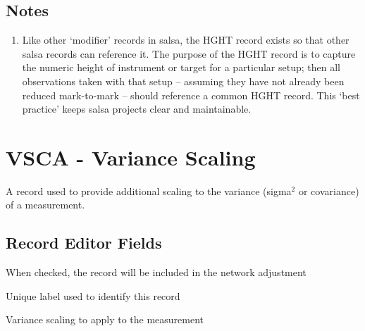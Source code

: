 \subsection*{Notes}
\begin{enumerate}
\item Like other `modifier' records in \textsf{salsa}, the HGHT record exists so that other \textsf{salsa} records can reference it.
The purpose of the HGHT record is to capture the numeric height of instrument or target for a particular setup; then all observations
taken with that setup -- assuming they have not already been reduced mark-to-mark -- should reference a common HGHT record.  This `best practice' keeps \textsf{salsa} projects clear and maintainable.
\end{enumerate}


\newpage
\section{VSCA - Variance Scaling}

A record used to provide additional scaling to the variance (sigma$^2$ or covariance) of a measurement.

\subsection*{Record Editor Fields}

\begin{description}[leftmargin=!,labelwidth=\widthof{\bfseries Enabled:}]
\item[Enabled:] When checked, the record will be included in the network adjustment
\item[Label:] Unique label used to identify this record
\item[Scaling:] Variance scaling to apply to the measurement
\end{description}

